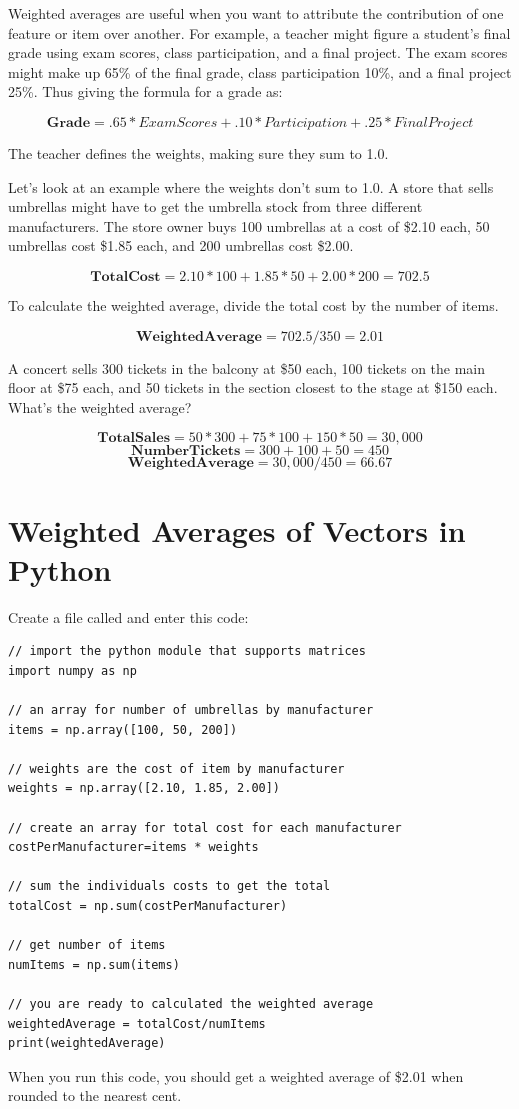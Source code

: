 Weighted averages are useful when you want to attribute the contribution of one feature or item over another. For example, a teacher might figure a student's final grade using exam scores, class participation, and a final project. The exam scores might make up 65\% of the final grade, class participation 10\%, and a final project 25\%. Thus giving the formula for a grade as:

\[
\mathbf{Grade} = .65*ExamScores + .10*Participation + .25*FinalProject
\]

The teacher defines the weights, making sure they sum to 1.0. 

Let's look at an example where the weights don't sum to 1.0. A store that sells umbrellas might have to get the umbrella stock from three different manufacturers. The store owner buys 100 umbrellas at a cost of \$2.10 each, 50 umbrellas cost \$1.85 each, and 200 umbrellas cost \$2.00. 

\[
\mathbf{TotalCost} = 2.10*100 + 1.85*50 + 2.00*200 = 702.5
\]

To calculate the weighted average, divide the total cost by the number of items.

\[
\mathbf{WeightedAverage} = 702.5/350 = 2.01 
\]

\begin{Exercise}[title={Weighted Average}, label=weightedAverage]
A concert sells 300 tickets in the balcony at \$50 each, 100 tickets on the main floor at \$75 each, and 50 tickets in the section closest to the stage at \$150 each. What's the weighted average?
\end{Exercise}
\begin{Answer}[ref=weightedAverage]
\[\mathbf{TotalSales} = 50*300 + 75*100 + 150*50 = 30,000\]
\[\mathbf{NumberTickets} = 300 + 100 + 50 = 450\]
\[\mathbf{WeightedAverage} = 30,000/450 = 66.67\]
\end{Answer}

\section{Weighted Averages of Vectors in Python}
Create a file called  and enter this code:

\begin{Verbatim}
// import the python module that supports matrices
import numpy as np

// an array for number of umbrellas by manufacturer
items = np.array([100, 50, 200])

// weights are the cost of item by manufacturer
weights = np.array([2.10, 1.85, 2.00])

// create an array for total cost for each manufacturer
costPerManufacturer=items * weights

// sum the individuals costs to get the total
totalCost = np.sum(costPerManufacturer)

// get number of items
numItems = np.sum(items) 

// you are ready to calculated the weighted average
weightedAverage = totalCost/numItems
print(weightedAverage)
\end{Verbatim}

When you run this code, you should get a weighted average of \$2.01 when rounded to the nearest cent.


